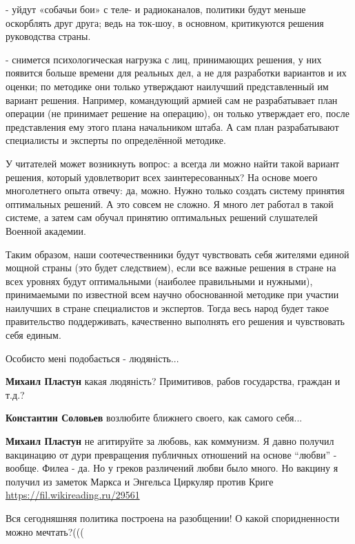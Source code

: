 \begin{itemize}
- уйдут «собачьи бои» с теле- и радиоканалов, политики будут меньше оскорблять
друг друга; ведь на ток-шоу, в основном, критикуются решения руководства
страны.

- снимется психологическая нагрузка с лиц, принимающих решения, у них появится
больше времени для реальных дел, а не для разработки вариантов и их оценки; по
методике они только утверждают наилучший представленный им вариант решения.
Например, командующий армией сам не разрабатывает план операции (не принимает
решение на операцию), он только утверждает его, после представления ему этого
плана начальником штаба. А сам план разрабатывают специалисты и эксперты по
определённой методике.

У читателей может возникнуть вопрос: а всегда ли можно найти такой вариант
решения, который удовлетворит всех заинтересованных? На основе моего
многолетнего опыта отвечу: да, можно. Нужно только создать систему принятия
оптимальных решений. А это совсем не сложно. Я много лет работал в такой
системе, а затем сам обучал принятию оптимальных решений слушателей Военной
академии.

Таким образом, наши соотечественники будут чувствовать себя жителями единой
мощной страны (это будет следствием), если все важные решения в стране на всех
уровнях будут оптимальными (наиболее правильными и нужными), принимаемыми по
известной всем научно обоснованной методике при участии наилучших в стране
специалистов и экспертов. Тогда весь народ будет такое правительство
поддерживать, качественно выполнять его решения и чувствовать себя единым.


Особисто мені подобається - людяність...

\begin{itemize} %
\textbf{Михаил Пластун} какая людяність? Примитивов, рабов государства, граждан и т.д.?

\textbf{Константин Соловьев} возлюбите ближнего своего, как самого себя...

\textbf{Михаил Пластун} не агитируйте за любовь, как коммунизм. Я давно получил вакцинацию от дури превращения публичных отношений на основе \enquote{любви} - вообще.
Филеа - да. Но у греков различений любви было много.
Но вакцину я получил из заметок Маркса и Энгельса Циркуляр против Криге
\url{https://fil.wikireading.ru/29561}
\end{itemize} %

Вся сегодняшняя политика построена на разобщении! О какой споридненности можно мечтать?(((


\end{itemize}
